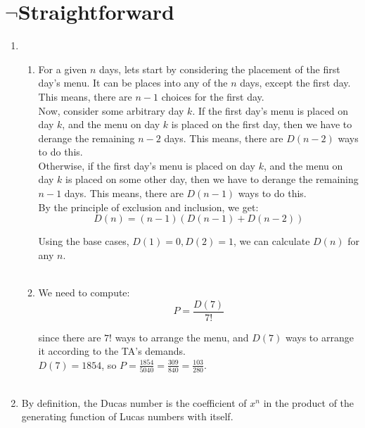 \documentclass[a4paper]{article}
\begin{document}
\section{$\neg$Straightforward}
    \begin{enumerate}
        
        \item \begin{enumerate}
            \item For a given $n$ days, lets start by considering the placement of the first day's menu. It can be places into any of the $n$ days, except the first day. This means, there are $n-1$ choices for the first day. \\
            
            Now, consider some arbitrary day $k$. If the first day's menu is placed on day $k$, and the menu on day $k$ is placed on the first day, then we have to derange the remaining $n-2$ days. This means, there are $D(n-2)$ ways to do this. \\

            Otherwise, if the first day's menu is placed on day $k$, and the menu on day $k$ is placed on some other day, then we have to derange the remaining $n-1$ days. This means, there are $D(n-1)$ ways to do this. \\

            By the principle of exclusion and inclusion, we get:
            \[ D(n) = (n-1)(D(n-1) + D(n-2)) \]

            Using the base cases, $D(1) = 0, D(2) = 1$, we can calculate $D(n)$ for any $n$. \\ \\

            \item We need to compute:
            \[ P = \frac{D(7)}{7!} \]

            since there are $7!$ ways to arrange the menu, and $D(7)$ ways to arrange it according to the TA's demands. \\

            $D(7) = 1854$, so $P = \frac{1854}{5040} = \frac{309}{840} = \frac{103}{280}$. \\ \\
        \end{enumerate}

        \item By definition, the Ducas number is the coefficient of $x^n$ in the product of the generating function of Lucas numbers with itself. \\
        

\end{enumerate}
\end{document}
